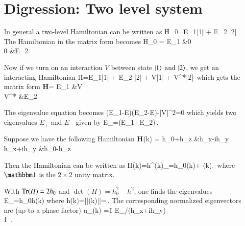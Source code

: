 \section{Digression: Two level system}
In general a two-level Hamiltonian can be written as
\blgn
\h H_0=E_1|1\rngl{}| + E_2 |2\rngl{}|\,
\elgn
The Hamiltonian in the matrix form becomes
\blgn
H_0 =
\bbmat
E_1 &0\\
0   &E_2
\ebmat
\elgn

Now if we turn on an interaction $V$ between state $|1\rangle$ and $|2\rangle$,
we get an interacting Hamiltonian
\blgn
\h H=E_1|1\rngl{}| + E_2 |2\rngl{}| + V|1\rngl{}| + V^*|2\rngl{}|\,
\elgn
which gets the matrix form
\blgn
{\bf H}=
\bbmat
E_1 &V\\
V^*   &E_2
\ebmat
\elgn

The eigenvalue equation becomes
\blgn
(E_1-E)(E_2-E)-|V|^2=0
\elgn
which yields two eigenvalues $E_+$ and $E_-$ given by
\blgn
E_\pm=(E_1+E_2)\pm{}\,.
\elgn

Suppose we have the following Hamiltonian
\blgn
{\bf H}(k)
=
\bbmat
h_0+h_z  &h_x-ih_y\\
h_x+ih_y &h_0-h_z
\ebmat
\elgn

Then the Hamiltonian can be written as
\blgn
H(k)=h^\mu(k)\sig_\mu=h_0(k)\bbone + (k).\vec{\sig}\,
\elgn
where $\bbone$ is the $2\times2$ unity matrix.

With $\Tr(H)=2h_0$ and $\det (H)=h_0^2-h^2$, one finds the eigenvalues
\blgn
E_\pm=h_0\pm h(k)
\label{eq:dispersion:tls}
\elgn
where 
\blgn
h(k)=||(k)||=\,.
\elgn
The corresponding normalized eigenvectors are (up to a phase factor)
\blgn
u_\pm(k)
=\f{1}{}
\bbmat
E_\pm/(h_x+ih_y)\\
1
\ebmat\,.
\elgn